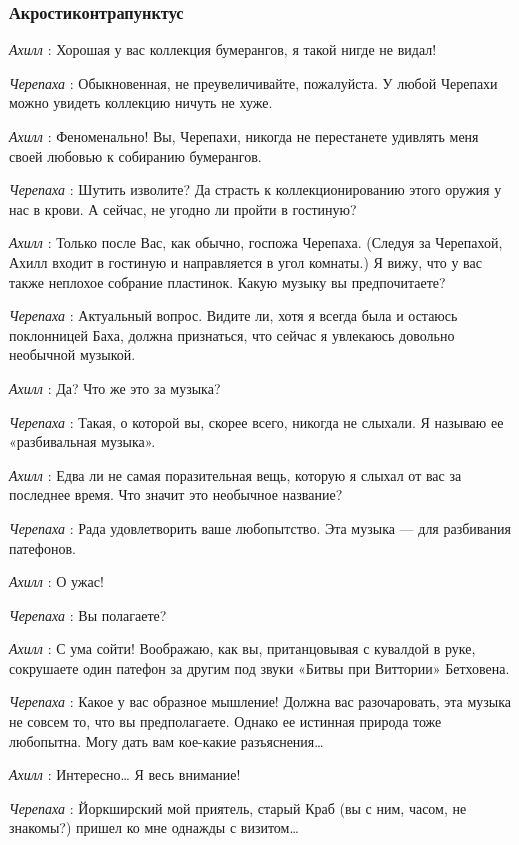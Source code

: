 \subsubsection{Акростиконтрапунктус}

\emph{Ахилл} : Хорошая у вас коллекция бумерангов, я такой нигде не видал!

\emph{Черепаха} : Обыкновенная, не преувеличивайте, пожалуйста. У любой Черепахи можно увидеть коллекцию ничуть не хуже.

\emph{Ахилл} : Феноменально! Вы, Черепахи, никогда не перестанете удивлять меня своей любовью к собиранию бумерангов.

\emph{Черепаха} : Шутить изволите? Да страсть к коллекционированию этого оружия у нас в крови. А сейчас, не угодно ли пройти в гостиную?

\emph{Ахилл} : Только после Вас, как обычно, госпожа Черепаха. (Следуя за Черепахой, Ахилл входит в гостиную и направляется в угол комнаты.) Я вижу, что у вас также неплохое собрание пластинок. Какую музыку вы предпочитаете?

\emph{Черепаха} : Актуальный вопрос. Видите ли, хотя я всегда была и остаюсь поклонницей Баха, должна признаться, что сейчас я увлекаюсь довольно необычной музыкой.

\emph{Ахилл} : Да? Что же это за музыка?

\emph{Черепаха} : Такая, о которой вы, скорее всего, никогда не слыхали. Я называю ее «разбивальная музыка».

\emph{Ахилл} : Едва ли не самая поразительная вещь, которую я слыхал от вас за последнее время. Что значит это необычное название?

\emph{Черепаха} : Рада удовлетворить ваше любопытство. Эта музыка --- для разбивания патефонов.

\emph{Ахилл} : О ужас!

\emph{Черепаха} : Вы полагаете?

\emph{Ахилл} : С ума сойти! Воображаю, как вы, пританцовывая с кувалдой в руке, сокрушаете один патефон за другим под звуки «Битвы при Виттории» Бетховена.

\emph{Черепаха} : Какое у вас образное мышление! Должна вас разочаровать, эта музыка не совсем то, что вы предполагаете. Однако ее истинная природа тоже любопытна. Могу дать вам кое-какие разъяснения\ldots{}

\emph{Ахилл} : Интересно\ldots{} Я весь внимание!

\emph{Черепаха} : Йоркширский мой приятель, старый Краб (вы с ним, часом, не знакомы?) пришел ко мне однажды с визитом\ldots{}

